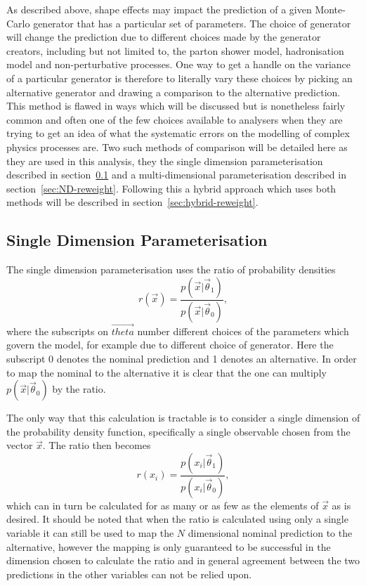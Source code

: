 As described above, shape effects may impact the prediction of a given
Monte-Carlo generator that has a particular set of parameters. The choice of
generator will change the prediction due to different choices made by the
generator creators, including but not limited to, the parton shower model,
hadronisation model and non-perturbative processes. One way to get a handle on
the variance of a particular generator is therefore to literally vary these
choices by picking an alternative generator and drawing a comparison to the
alternative prediction. This method is flawed in ways which will be discussed
but is nonetheless fairly common and often one of the few choices available to
analysers when they are trying to get an idea of what the systematic errors on
the modelling of complex physics processes are. Two such methods of comparison
will be detailed here as they are used in this analysis, they the single
dimension parameterisation described in section~\ref{sec:1D-reweight} and a
multi-dimensional parameterisation described in section~\ref{sec:ND-reweight}.
Following this a hybrid approach which uses both methods will be described in
section~\ref{sec:hybrid-reweight}. 

\subsection{Single Dimension Parameterisation}
\label{sec:1D-reweight}

The single dimension parameterisation uses the ratio of probability densities
\begin{equation}
  r(\vec{x}) = \frac{p(\vec{x}|\vec{\theta}_{1})}{p(\vec{x}|\vec{\theta}_{0})},
  \label{eq:DensityRatio}
\end{equation}
where the subscripts on $\vec{theta}$ number different choices of the parameters
which govern the model, for example due to different choice of generator. Here
the subscript 0 denotes the nominal prediction and 1 denotes an alternative. In
order to map the nominal to the alternative it is clear that the one can
multiply $p(\vec{x}|\vec{\theta}_{0})$ by the ratio.

The only way that this calculation is tractable is to consider a single
dimension of the probability density function, specifically a single observable
chosen from the vector $\vec{x}$. The ratio then becomes
\begin{equation}
  r(x_{i}) = \frac{p(x_{i}|\vec{\theta}_{1})}{p(x_{i}|\vec{\theta}_{0})},
  \label{eq:1D-ratio}
\end{equation}
which can in turn be calculated for as many or as few as the elements of
$\vec{x}$ as is desired. It should be noted that when the ratio is calculated
using only a single variable it can still be used to map the $N$ dimensional
nominal prediction to the alternative, however the mapping is only guaranteed to
be successful in the dimension chosen to calculate the ratio and in general
agreement between the two predictions in the other variables can not be relied
upon.

